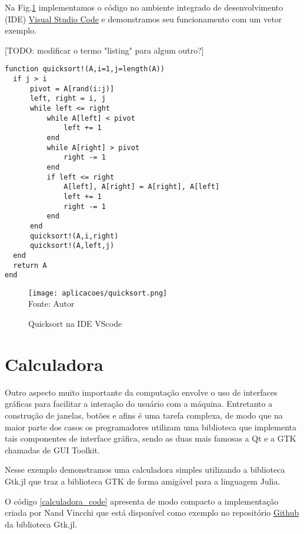 Na Fig.\ref{quicksort} implementamos o código no ambiente integrado de desenvolvimento (IDE) \href{https://code.visualstudio.com/docs}{Visual Studio Code} e demonstramos seu funcionamento com um vetor exemplo. 

[TODO: modificar o termo "listing" para algum outro?] 
\begin{lstlisting}[label={quicksort_code},caption={Implementação do algoritmo quicksort em Julia}]
  function quicksort!(A,i=1,j=length(A))
  if j > i
      pivot = A[rand(i:j)] 
      left, right = i, j
      while left <= right
          while A[left] < pivot
              left += 1
          end
          while A[right] > pivot
              right -= 1
          end
          if left <= right
              A[left], A[right] = A[right], A[left]
              left += 1
              right -= 1
          end
      end
      quicksort!(A,i,right)
      quicksort!(A,left,j)
  end
  return A
end
\end{lstlisting}

\begin{figure}[H]
   \begin{center}
       \caption{Quicksort na IDE VScode} \label{quicksort}
       \texttt{[image: aplicacoes/quicksort.png]} \\
       {\tiny \sf Fonte: Autor}
   \end{center}
\end{figure}

\section{Calculadora}
Outro aspecto muito importante da computação envolve o uso de interfaces gráficas para facilitar a interação do usuário com a máquina.
Entretanto a construção de janelas, botões e afins é uma tarefa complexa, de modo que na maior parte dos casos os programadores utilizam uma biblioteca que implementa tais componentes de interface gráfica, sendo as duas mais famosas a Qt e a GTK chamadas de GUI Toolkit. %

Nesse exemplo demonstramos uma calculadora simples utilizando a biblioteca Gtk.jl que traz a biblioteca GTK de forma amigável para a linguagem Julia. 

O código \ref{calculadora_code} apresenta de modo compacto a implementação criada por Nand Vincchi que está disponível como exemplo no repositório \href{https://github.com/JuliaGraphics/Gtk.jl/blob/master/example/calculator.jl}{Github} da biblioteca Gtk.jl. 

